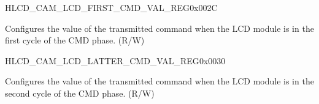 \begin{register}{H}{LCD\_CAM\_LCD\_FIRST\_CMD\_VAL\_REG}{0x002C}\label{regdesc:LCDCAMLCDFIRSTCMDVALREG}
%
\regnewline%
\begin{regdesc}\begin{reglist}
\label{fielddesc:LCDCAMLCDFIRSTCMDVALUE}\item [LCD\_CAM\_LCD\_FIRST\_CMD\_VALUE] Configures the value of the transmitted command when the LCD module is in the first cycle of the CMD phase. (R/W)
\end{reglist}\end{regdesc}
\end{register}

\begin{register}{H}{LCD\_CAM\_LCD\_LATTER\_CMD\_VAL\_REG}{0x0030}\label{regdesc:LCDCAMLCDLATTERCMDVALREG}
%
\regnewline%
\begin{regdesc}\begin{reglist}
\label{fielddesc:LCDCAMLCDLATTERCMDVALUE}\item [LCD\_CAM\_LCD\_LATTER\_CMD\_VALUE] Configures the value of the transmitted command when the LCD module is in the second cycle of the CMD phase. (R/W)
\end{reglist}\end{regdesc}
\end{register}
